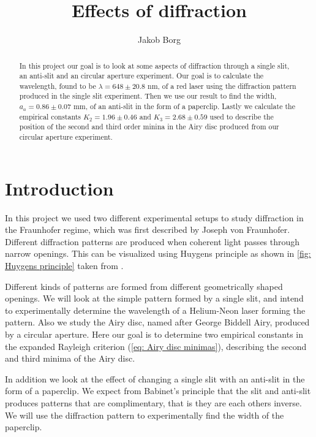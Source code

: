 \documentclass{emulateapj}
\begin{document}
\title{Effects of diffraction}

\author{Jakob Borg}





\begin{abstract}
In this project our goal is to look at some aspects of diffraction through a single slit, an anti-slit and an circular aperture experiment. Our goal is to calculate the wavelength, found to be $\lambda =  648 \pm 20.8$ nm, of a red laser using the diffraction pattern produced in the single slit experiment. Then we use our result to find the width, $a_a = 0.86\pm 0.07$ mm, of an anti-slit in the form of a paperclip. Lastly we calculate the empirical constants $K_2 = 1.96 \pm 0.46$ and $K_3 = 2.68 \pm 0.59$ used to describe the position of the second and third order minina in the Airy disc produced from our circular aperture experiment.
\end{abstract}


\section{Introduction}
\label{sec:introduction}
In this project we used two different experimental setups to study diffraction in the Fraunhofer regime, which was first described by Joseph von Fraunhofer. Different diffraction patterns are produced when coherent light passes through narrow openings. This can be visualized using Huygens principle as shown in \cref{fig: Huygens principle} taken from \citep{Huygens}.

Different kinds of patterns are formed from different geometrically shaped openings. We will look at the simple pattern formed by a single slit, and intend to experimentally determine the wavelength of a Helium-Neon laser forming the pattern. Also we study the Airy disc, named after George Biddell Airy, produced by a circular aperture. Here our goal is to determine two empirical constants in the expanded Rayleigh criterion (\cref{eq: Airy disc minimas}), describing the second and third minima of the Airy disc.

In addition we look at the effect of changing a single slit with an anti-slit in the form of a paperclip. We expect from Babinet's principle \citep{swaves} that the slit and anti-slit produces patterns that are complimentary, that is they are each others inverse. We will use the diffraction pattern to experimentally find the width of the paperclip.
\end{document}
